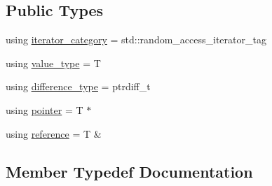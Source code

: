 \subsection*{Public Types}
\begin{DoxyCompactItemize}
\item 
using \hyperlink{structnlohmann_1_1detail_1_1iterator__traits_3_01T_01_5_00_01enable__if__t_3_01std_1_1is__object_3_01T_01_4_1_1value_01_4_01_4_a9b043cfe0fdfb3e9665428fb2be9cea1}{iterator\+\_\+category} = std\+::random\+\_\+access\+\_\+iterator\+\_\+tag
\item 
using \hyperlink{structnlohmann_1_1detail_1_1iterator__traits_3_01T_01_5_00_01enable__if__t_3_01std_1_1is__object_3_01T_01_4_1_1value_01_4_01_4_a443e6a62f5fb2c545fc71c751b98ca8d}{value\+\_\+type} = T
\item 
using \hyperlink{structnlohmann_1_1detail_1_1iterator__traits_3_01T_01_5_00_01enable__if__t_3_01std_1_1is__object_3_01T_01_4_1_1value_01_4_01_4_ae7be99eb434f5b5f34692874c272b759}{difference\+\_\+type} = ptrdiff\+\_\+t
\item 
using \hyperlink{structnlohmann_1_1detail_1_1iterator__traits_3_01T_01_5_00_01enable__if__t_3_01std_1_1is__object_3_01T_01_4_1_1value_01_4_01_4_a33ee9a1beb8ee099f989fd4af15178a5}{pointer} = T $\ast$
\item 
using \hyperlink{structnlohmann_1_1detail_1_1iterator__traits_3_01T_01_5_00_01enable__if__t_3_01std_1_1is__object_3_01T_01_4_1_1value_01_4_01_4_a0809c5949d22f08a993231d2fdf285f0}{reference} = T \&
\end{DoxyCompactItemize}


\subsection{Member Typedef Documentation}
